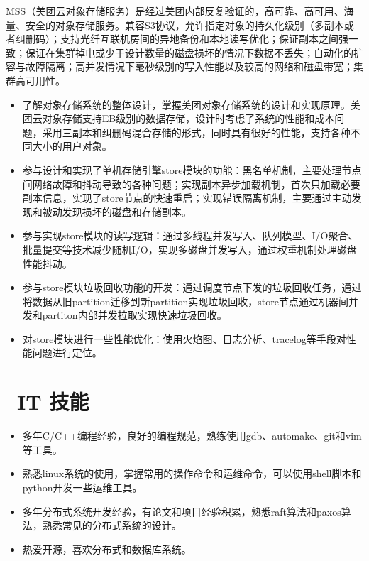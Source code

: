 \documentclass{resume}
\begin{document}
MSS（美团云对象存储服务）是经过美团内部反复验证的，高可靠、高可用、海量、安全的对象存储服务。兼容S3协议，允许指定对象的持久化级别（多副本或者纠删码）；支持光纤互联机房间的异地备份和本地读写优化；保证副本之间强一致；保证在集群掉电或少于设计数量的磁盘损坏的情况下数据不丢失；自动化的扩容与故障隔离；高并发情况下毫秒级别的写入性能以及较高的网络和磁盘带宽；集群高可用性。
\begin{itemize}
  \item 了解对象存储系统的整体设计，掌握美团对象存储系统的设计和实现原理。美团云对象存储支持EB级别的数据存储，设计时考虑了系统的性能和成本问题，采用三副本和纠删码混合存储的形式，同时具有很好的性能，支持各种不同大小的用户对象。
  \item 参与设计和实现了单机存储引擎store模块的功能：黑名单机制，主要处理节点间网络故障和抖动导致的各种问题；实现副本异步加载机制，首次只加载必要副本信息，实现了store节点的快速重启；实现错误隔离机制，主要通过主动发现和被动发现损坏的磁盘和存储副本。
  \item 参与实现store模块的读写逻辑：通过多线程并发写入、队列模型、I/O聚合、批量提交等技术减少随机I/O，实现多磁盘并发写入，通过权重机制处理磁盘性能抖动。
  \item 参与store模块垃圾回收功能的开发：通过调度节点下发的垃圾回收任务，通过将数据从旧partition迁移到新partition实现垃圾回收，store节点通过机器间并发和partiton内部并发拉取实现快速垃圾回收。
  \item 对store模块进行一些性能优化：使用火焰图、日志分析、tracelog等手段对性能问题进行定位。
\end{itemize}


\section{\faCogs\ IT 技能}
\begin{itemize}[parsep=0.5ex]
  \item 多年C/C++编程经验，良好的编程规范，熟练使用gdb、automake、git和vim等工具。
  \item 熟悉linux系统的使用，掌握常用的操作命令和运维命令，可以使用shell脚本和python开发一些运维工具。
  \item 多年分布式系统开发经验，有论文和项目经验积累，熟悉raft算法和paxos算法，熟悉常见的分布式系统的设计。
  \item 热爱开源，喜欢分布式和数据库系统。
\end{itemize}
\end{document}

